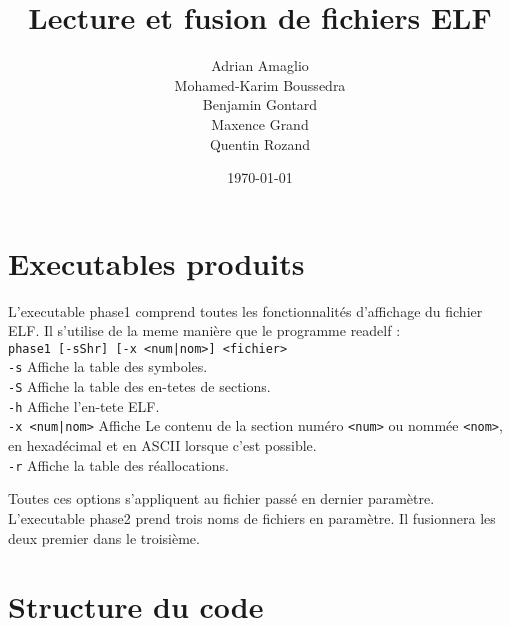 \documentclass[10pt,oneside]{article}   %
\begin{document}
\title{Lecture et fusion de fichiers ELF}           %
\author{Adrian Amaglio\\Mohamed-Karim Boussedra\\Benjamin Gontard\\Maxence Grand\\Quentin Rozand}
\date{\today}
\maketitle
\tableofcontents


\section{Executables produits}
	\begin{minipage}{\textwidth}
		L'executable phase1 comprend toutes les fonctionnalités d'affichage du fichier ELF. 
		Il s'utilise de la meme manière que le programme readelf \cite{readelf}:\\
			\texttt{phase1 [-sShr] [-x <num|nom>] <fichier>}\\
			\texttt{-s} Affiche la table des symboles.\\
			\texttt{-S} Affiche la table des en-tetes de sections.\\
			\texttt{-h} Affiche l'en-tete ELF.\\
			\texttt{-x <num|nom>} Affiche Le contenu de la section numéro \texttt{<num>} ou nommée \texttt{<nom>}, en hexadécimal et en ASCII lorsque c'est possible.\\
			\texttt{-r} Affiche la table des réallocations.\\
	\end{minipage}
	Toutes ces options s'appliquent au fichier passé en dernier paramètre. L'executable phase2 prend trois noms de fichiers en paramètre. Il fusionnera les deux premier dans le troisième.

\section{Structure du code}
\end{document}
